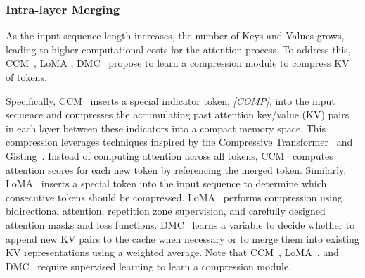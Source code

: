 \subsubsection{Intra-layer Merging}\label{sssec:kv_merge_intra_layer}
As the input sequence length increases, the number of Keys and Values grows, leading to higher computational costs for the attention process. To address this, CCM~\cite{DBLP:conf/iclr/KimYYS24}, LoMA \cite{wangLoMALosslessCompressed2024}, DMC~\cite{nawrotDynamicMemoryCompression2024} propose to learn a compression module to compress KV of tokens.

Specifically, CCM~\cite{DBLP:conf/iclr/KimYYS24} inserts a special indicator token, \textit{[COMP]}, into the input sequence and compresses the accumulating past attention key/value (KV) pairs in each layer between these indicators into a compact memory space. This compression leverages techniques inspired by the Compressive Transformer~\cite{DBLP:conf/iclr/RaePJHL20} and Gisting~\cite{DBLP:conf/nips/Mu0G23}. 
Instead of computing attention across all tokens, CCM~\cite{DBLP:conf/iclr/KimYYS24} 
computes attention scores for each new token by referencing the merged token. 
Similarly, LoMA~\cite{wangLoMALosslessCompressed2024} inserts a special token into the input sequence to determine which consecutive tokens should be compressed.
LoMA~\cite{wangLoMALosslessCompressed2024} performs compression using bidirectional attention, repetition zone supervision, and carefully designed attention masks and loss functions.
DMC~\cite{nawrotDynamicMemoryCompression2024} learns a variable to decide whether to append new KV pairs to the cache when necessary or to merge them into existing KV representations using a weighted average.
Note that CCM~\cite{DBLP:conf/iclr/KimYYS24}, LoMA~\cite{wangLoMALosslessCompressed2024}, and DMC~\cite{nawrotDynamicMemoryCompression2024} require supervised learning to learn a compression module.



